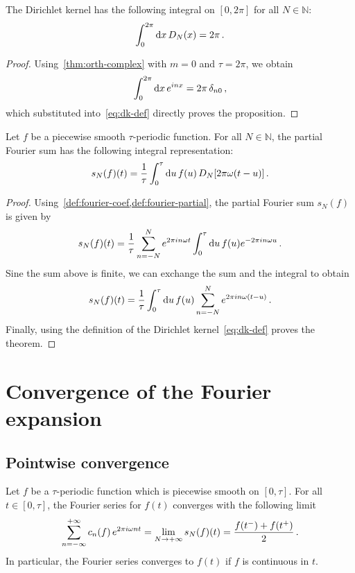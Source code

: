 \begin{proposition}
  The Dirichlet kernel has the following integral on $[0,2\pi]$ for all $N\in\mathbb{N}$:
  \begin{equation}
    \int_0^{2\pi}\mathrm{d} x\,D_N(x)=2\pi\,.
  \end{equation}
\end{proposition}
\begin{proof}
  Using~\cref{thm:orth-complex} with $m=0$ and $\tau=2\pi$, we obtain
  \begin{equation}
    \int_{0}^{2\pi}\mathrm{d} x\,e^{inx}=2\pi\,\delta_{n0}\,,
  \end{equation}
  which substituted into~\cref{eq:dk-def} directly proves the proposition.
\end{proof}
\begin{theorem}
  Let $f$ be a piecewise smooth $\tau$-periodic function. For all
  $N\in\mathbb{N}$, the partial Fourier sum has the following integral representation:
  \begin{equation}
    s_N(f)(t)=\frac{1}{\tau}\int_0^{\tau}\mathrm{d} u\,f(u)\,D_N[2\pi\omega(t-u)]\,.
  \end{equation}
\end{theorem}
\begin{proof}
  Using~\cref{def:fourier-coef,def:fourier-partial}, the partial Fourier sum $s_N(f)$
  is given by
  \begin{equation}
    s_N(f)(t)=\frac{1}{\tau}\sum_{n=-N}^{N}e^{2\pi i n\omega t}
    \int_0^\tau\mathrm{d} u\,f(u)e^{-2\pi i n\omega u}\,.
  \end{equation}
  Sine the sum above is finite, we can exchange the sum and the integral to obtain
  \begin{equation}
    s_N(f)(t)=\frac{1}{\tau}\int_0^\tau\mathrm{d} u\,f(u)\sum_{n=-N}^{N}e^{2\pi i n\omega (t-u)}\,.
  \end{equation}
  Finally, using the definition of the Dirichlet kernel~\cref{eq:dk-def} proves the theorem.
\end{proof}
\section{Convergence of the Fourier expansion}
\subsection{Pointwise convergence}
\begin{theorem}[Fourier]
  \label{thm:fourier-pt}
  Let $f$ be a $\tau$-periodic function which is piecewise smooth on $[0,\tau]$. For all
  $t\in[0,\tau]$, the Fourier series for $f(t)$ converges with the following limit
  \begin{equation}
    \sum_{n=-\infty}^{+\infty}c_n(f)\,e^{2\pi i \omega nt}=\lim_{N\to+\infty}s_N(f)(t)=\frac{f(t^-)+f(t^+)}{2}\,.
  \end{equation}
  In particular, the Fourier series converges to $f(t)$ if $f$ is continuous in $t$.
\end{theorem}
